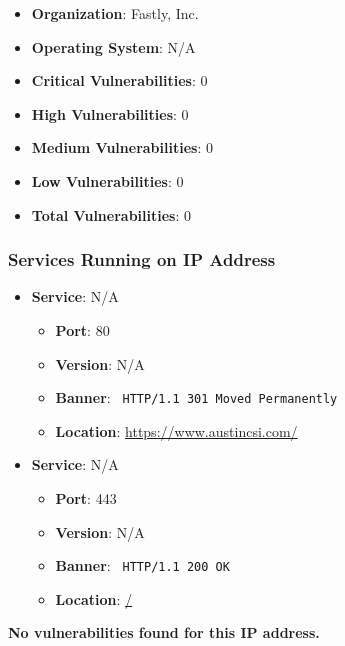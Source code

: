 \documentclass{article}
\begin{document}
\begin{itemize}
    \item \textbf{Organization}: Fastly, Inc.
    \item \textbf{Operating System}:  N/A 
    \item \textbf{Critical Vulnerabilities}: 0
    \item \textbf{High Vulnerabilities}: 0
    \item \textbf{Medium Vulnerabilities}: 0
    \item \textbf{Low Vulnerabilities}: 0
    \item \textbf{Total Vulnerabilities}: 0
\end{itemize}

\subsubsection*{Services Running on IP Address}

\begin{itemize}
    
        \item \textbf{Service}: N/A
        \begin{itemize}
            \item \textbf{Port}: 80
            \item \textbf{Version}:  N/A 
            \item \textbf{Banner}: \texttt{ HTTP/1.1 301 Moved Permanently
 }
            \item \textbf{Location}: \href{ https://www.austincsi.com/ }{ https://www.austincsi.com/ }
        \end{itemize}
    
        \item \textbf{Service}: N/A
        \begin{itemize}
            \item \textbf{Port}: 443
            \item \textbf{Version}:  N/A 
            \item \textbf{Banner}: \texttt{ HTTP/1.1 200 OK
 }
            \item \textbf{Location}: \href{ / }{ / }
        \end{itemize}
    
\end{itemize}


\textbf{No vulnerabilities found for this IP address.}


\clearpage
\end{document}
